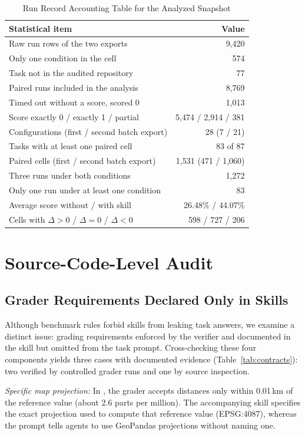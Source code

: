 \documentclass[10pt,conference]{IEEEtran}
\begin{document}
\begin{table}[t]
\caption{Run Record Accounting Table for the Analyzed Snapshot}
\label{tab:data}
\centering
\begin{tabular}{@{}lr@{}}
\toprule
Statistical item & Value \\
\midrule
Raw run rows of the two exports & 9,420 \\
\quad Only one condition in the cell & 574 \\
\quad Task not in the audited repository & 77 \\
Paired runs included in the analysis & 8,769 \\
\quad Timed out without a score, scored 0 & 1,013 \\
\quad Score exactly 0 / exactly 1 / partial & 5,474 / 2,914 / 381 \\
Configurations (first / second batch export) & 28 (7 / 21) \\
Tasks with at least one paired cell & 83 of 87 \\
Paired cells (first / second batch export) & 1,531 (471 / 1,060) \\
\quad Three runs under both conditions & 1,272 \\
\quad Only one run under at least one condition & 83 \\
Average score without / with skill & 26.48\% / 44.07\% \\
Cells with $\Delta>0$ / $\Delta=0$ / $\Delta<0$ & 598 / 727 / 206 \\
\bottomrule
\end{tabular}
\end{table}

\section{Source-Code-Level Audit}
\label{sec:audit}
\subsection{Grader Requirements Declared Only in Skills}
Although benchmark rules forbid skills from leaking task answers, we examine a distinct issue: grading requirements enforced by the verifier and documented in the skill but omitted from the task prompt. Cross-checking these four components yields three cases with documented evidence (Table~\ref{tab:contracts}): two verified by controlled grader runs and one by source inspection.

\leavevmode{} \emph{Specific map projection:} In , the grader accepts distances only within 0.01\,km of the reference value (about 2.6 parts per million). The accompanying skill specifies the exact projection used to compute that reference value (EPSG:4087), whereas the prompt tells agents to use GeoPandas projections without naming one.
\end{document}
